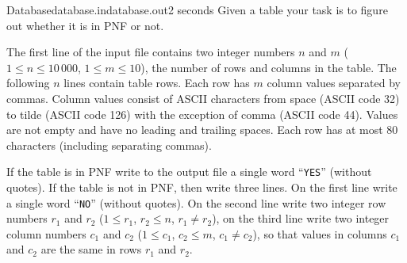 \begin{problem}{Database}{database.in}{database.out}{2 seconds}
Given a table your task is to figure out whether it is in PNF or not.

\InputFile

The first line of the input file contains two integer numbers $n$ and $m$ ($1 \le n \le 10\,000$, 
$1 \le m \le 10$), the number of rows and columns in the table.
The following $n$ lines contain table rows. Each row has $m$ column values separated by commas. 
Column values consist of ASCII characters from space (ASCII code 32) to tilde (ASCII code 126) 
with the exception of comma (ASCII code 44). Values are not empty and have no leading and trailing
spaces. Each row has at most 80 characters (including separating commas).

\OutputFile

If the table is in PNF write to the output file a single word ``\texttt{YES}'' (without quotes). If the table is not in PNF, 
then write three lines. On the first line write a single word ``\texttt{NO}'' (without quotes). On the second line write
two integer row numbers $r_1$ and $r_2$ ($1 \le r_1$, $r_2 \le n$, $r_1 \ne r_2$), on the third line write two 
integer column numbers $c_1$ and $c_2$ ($1 \le c_1$, $c_2 \le m$, $c_1 \ne c_2$), so that values in columns
$c_1$ and $c_2$ are the same in rows $r_1$ and $r_2$.

\Example

\exmpwidinf=12cm
\exmpwidouf=4cm

\begin{example}
%
%
\end{example}

\end{problem}
